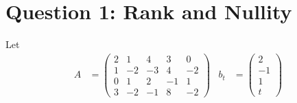 \documentclass[11pt,a4paper]{article}
\begin{document}
\section*{Question 1: Rank and Nullity}
Let
\begin{align*}
A&=\begin{pmatrix}
2&1&4&3&0\\
1&-2&-3&4&-2\\
0&1&2&-1&1\\
3&-2&-1&8&-2
\end{pmatrix}
&b_t&=\begin{pmatrix}2\\-1\\1\\t\end{pmatrix}
\end{align*}
\end{document}
